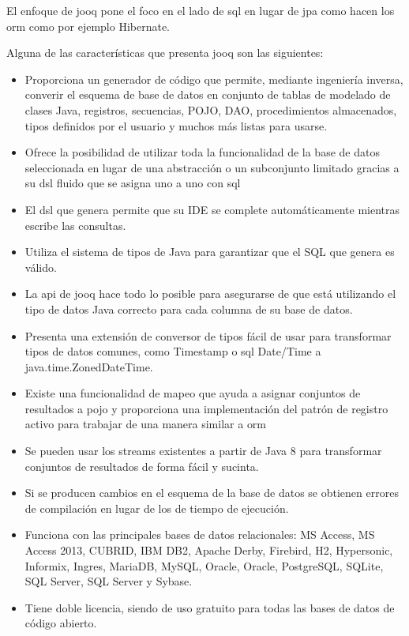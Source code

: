 El enfoque de \acrshort{jooq} pone el foco en el lado de \acrfull{sql} en lugar de \acrshort{jpa} como hacen los \acrfull{orm} como por ejemplo Hibernate.

Alguna de las características que presenta \acrshort{jooq} son las siguientes\citep{VentajasJooq}:


\begin{itemize}
\item Proporciona un generador de código que permite, mediante ingeniería inversa, converir el esquema de base de datos en conjunto de tablas de modelado de clases Java, registros, secuencias, POJO, DAO, procedimientos almacenados, tipos definidos por el usuario y muchos más listas para usarse. 
\item Ofrece la posibilidad de utilizar toda la funcionalidad de la base de datos seleccionada en lugar de una abstracción o un subconjunto limitado gracias a su \acrfull{dsl} fluido que se asigna uno a uno con \acrshort{sql}
\item El \acrfull{dsl} que genera permite que su IDE se complete automáticamente mientras escribe las consultas.
\item Utiliza el sistema de tipos de Java para garantizar que el SQL que genera es válido.
\item La \acrshort{api} de \acrshort{jooq} hace todo lo posible para asegurarse de que está utilizando el tipo de datos Java correcto para cada columna de su base de datos. 
\item Presenta una extensión de conversor de tipos fácil de usar para transformar tipos de datos comunes, como Timestamp o \acrshort{sql} Date/Time a java.time.ZonedDateTime.
\item Existe una funcionalidad de mapeo que ayuda a asignar conjuntos de resultados a \acrfull{pojo} y proporciona una implementación del patrón de registro activo para trabajar de una manera similar a \acrshort{orm}
\item Se pueden usar los streams existentes a partir de Java 8 para transformar conjuntos de resultados de forma fácil y sucinta.
\item Si se producen cambios en el esquema de la base de datos se obtienen errores de compilación en lugar de los de tiempo de ejecución.
\item Funciona con las principales bases de datos relacionales: MS Access, MS Access 2013, CUBRID, IBM DB2, Apache Derby, Firebird, H2, Hypersonic, Informix, Ingres, MariaDB, MySQL, Oracle, Oracle, PostgreSQL, SQLite, SQL Server, SQL Server y Sybase.
\item Tiene doble licencia, siendo de uso gratuito para todas las bases de datos de código abierto.
\end{itemize}


